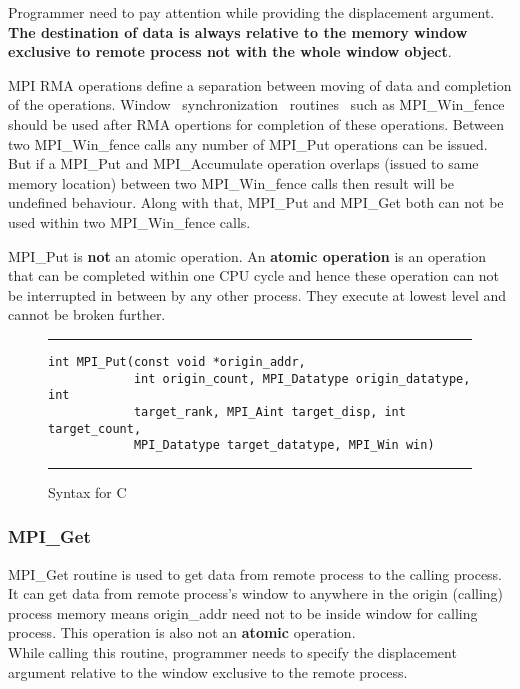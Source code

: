 \documentclass[12pt]{article}
\begin{document}
Programmer need to pay attention while providing the {\ttfamily displacement} argument. \textbf{The destination of data is always relative
to the memory window exclusive to {\ttfamily remote} process not with the whole window object}.

MPI RMA operations define a separation between moving of data and completion of the operations. Window ~synchronization ~routines ~such as
{\ttfamily MPI\_Win\_fence} should be used after RMA opertions for completion of these operations. Between two {\ttfamily MPI\_Win\_fence} calls
any number of {\ttfamily MPI\_Put} operations can be issued. But if a {\ttfamily MPI\_Put} and {\ttfamily MPI\_Accumulate} operation overlaps (issued 
to same memory location) between two {\ttfamily MPI\_Win\_fence} calls then result will be {\ttfamily undefined behaviour.} Along with that,
{\ttfamily MPI\_Put} and {\ttfamily MPI\_Get} both can not be used within two {\ttfamily MPI\_Win\_fence} calls.

{\ttfamily MPI\_Put} is \textbf{not} an atomic operation. An \textbf{atomic operation} is an operation that can be completed within one CPU cycle and
hence these operation can not be interrupted in between by any other process. They execute at lowest level and cannot be broken further.
\begin{figure}[!ht]
\hrule \vspace{5pt}
\begin{verbatim}
int MPI_Put(const void *origin_addr,
            int origin_count, MPI_Datatype origin_datatype, int
            target_rank, MPI_Aint target_disp, int target_count,
            MPI_Datatype target_datatype, MPI_Win win)
\end{verbatim}
\hrule
\caption{Syntax for C}
\end{figure}

\subsubsection{{\ttfamily MPI\_Get}}
{\ttfamily MPI\_Get} routine is used to get data from remote process to the calling process. It can get data from remote process's window to anywhere 
in the origin (calling) process memory means {\ttfamily origin\_addr} need not to be inside window for calling process. This operation is also not an
\textbf{atomic} operation.\\
While calling this routine, programmer needs to specify the {\ttfamily displacement} argument relative to the window exclusive to the remote process.
\end{document}
